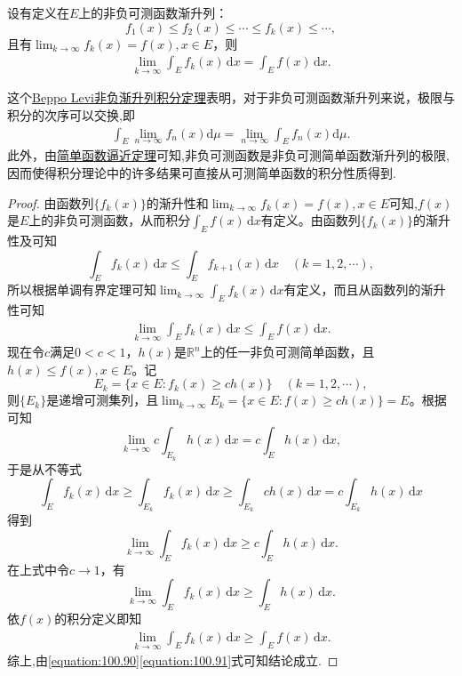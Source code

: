 \documentclass[../../main.tex]{subfiles}%
\begin{document}
\begin{theorem}\label{theorem:Beppo Levi非负渐升列积分定理}
设有定义在$E$上的非负可测函数渐升列：
\[
f_1(x) \leqslant f_2(x) \leqslant \cdots \leqslant f_k(x) \leqslant \cdots,
\]
且有$\lim_{k \to \infty} f_k(x) = f(x), x \in E$，则
\begin{align*}
\lim_{k \to \infty} \int_E f_k(x) \, \mathrm{d}x = \int_E f(x) \, \mathrm{d}x. 
\end{align*}
\end{theorem}
\begin{note}
这个\hyperref[theorem:Beppo Levi非负渐升列积分定理]{Beppo Levi非负渐升列积分定理}表明，对于非负可测函数渐升列来说，极限与积分的次序可以交换,即
\begin{align*}
\int_E \lim_{n \to \infty} f_n(x) \mathrm{d}\mu = \lim_{n \to \infty} \int_E f_n(x) \mathrm{d}\mu .
\end{align*}
此外，由\hyperref[theorem:简单函数逼近定理]{简单函数逼近定理}可知,非负可测函数是非负可测简单函数渐升列的极限,因而使得积分理论中的许多结果可直接从可测简单函数的积分性质得到.
\end{note}
\begin{proof}
由函数列$\{f_k(x)\}$的渐升性和$\lim_{k \to \infty} f_k(x) = f(x), x \in E$可知,$f(x)$是$E$上的非负可测函数，从而积分$\int_E f(x) \, \mathrm{d}x$有定义。由函数列$\{f_k(x)\}$的渐升性及可知
\[
\int_E f_k(x) \, \mathrm{d}x \leqslant \int_E f_{k + 1}(x) \, \mathrm{d}x \quad (k = 1,2,\cdots),
\]
所以根据单调有界定理可知$\lim_{k \to \infty} \int_E f_k(x) \, \mathrm{d}x$有定义，而且从函数列的渐升性可知
\begin{align}\label{equation:100.90}
\lim_{k \to \infty} \int_E f_k(x) \, \mathrm{d}x \leqslant \int_E f(x) \, \mathrm{d}x.
\end{align}
现在令$c$满足$0 < c < 1$，$h(x)$是$\mathbb{R}^n$上的任一非负可测简单函数，且$h(x) \leqslant f(x), x \in E$。记
\[
E_k = \{x \in E: f_k(x) \geqslant ch(x)\} \quad (k = 1,2,\cdots),
\]
则$\{E_k\}$是递增可测集列，且$\lim_{k \to \infty} E_k = \{x\in E:f(x)\geqslant ch(x)\}=E$。根据可知
\[
\lim_{k \to \infty} c \int_{E_k} h(x) \, \mathrm{d}x = c \int_E h(x) \, \mathrm{d}x,
\]
于是从不等式
\[
\int_E f_k(x) \, \mathrm{d}x \geqslant \int_{E_k} f_k(x) \, \mathrm{d}x \geqslant \int_{E_k} ch(x) \, \mathrm{d}x = c \int_{E_k} h(x) \, \mathrm{d}x
\]
得到
\[
\lim_{k \to \infty} \int_E f_k(x) \, \mathrm{d}x \geqslant c \int_E h(x) \, \mathrm{d}x.
\]
在上式中令$c \to 1$，有
\[
\lim_{k \to \infty} \int_E f_k(x) \, \mathrm{d}x \geqslant \int_E h(x) \, \mathrm{d}x.
\]
依$f(x)$的积分定义即知
\begin{align}\label{equation:100.91}
\lim_{k \to \infty} \int_E f_k(x) \, \mathrm{d}x \geqslant \int_E f(x) \, \mathrm{d}x.
\end{align}
综上,由\eqref{equation:100.90}\eqref{equation:100.91}式可知结论成立.
\end{proof}
\end{document}

